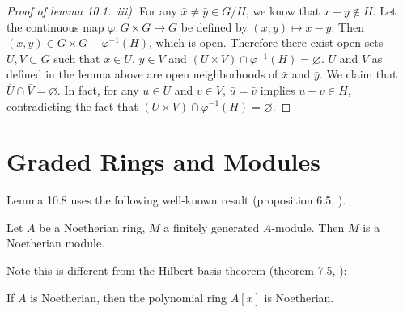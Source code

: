 \documentclass{note}
\begin{document}
\begin{proof}[Proof of lemma 10.1.~iii)] For any
  $\bar{x} \neq \bar{y} \in G/H$, we know that $x - y \notin H$. Let
  the continuous map $\varphi\colon G\times G \to G$ be defined by $(x,y) \mapsto
    x - y$. Then $(x,y) \in G\times G - \varphi^{-1}(H)$, which is open. Therefore
  there exist open sets $U,V \subset G$ such that $x\in U$, $y\in V$ and
  $(U\times V) \cap \varphi^{-1}(H) = \varnothing$. $\overline{U}$ and
  $\overline{V}$ as defined in the lemma above are open neighborhoods of
  $\bar{x}$ and $\bar{y}$. We claim that $\overline{U} \cap \overline{V} =
    \varnothing$. In fact, for any $u\in U$ and $v\in V$, $\bar{u} = \bar{v}$
  implies $u - v \in H$, contradicting the fact that $(U\times V) \cap
    \varphi^{-1}(H) = \varnothing$.
\end{proof}

\section*{Graded Rings and Modules}
Lemma 10.8 uses the following well-known result (proposition 6.5, ).
\begin{proposition*}
  Let $A$ be a Noetherian ring, $M$ a finitely generated $A$-module. Then $M$ is
  a Noetherian module.
\end{proposition*}
Note this is different from the Hilbert basis theorem (theorem 7.5, ):
\begin{theorem*}
  If $A$ is Noetherian, then the polynomial ring $A[x]$ is Noetherian.
\end{theorem*}
\end{document}
